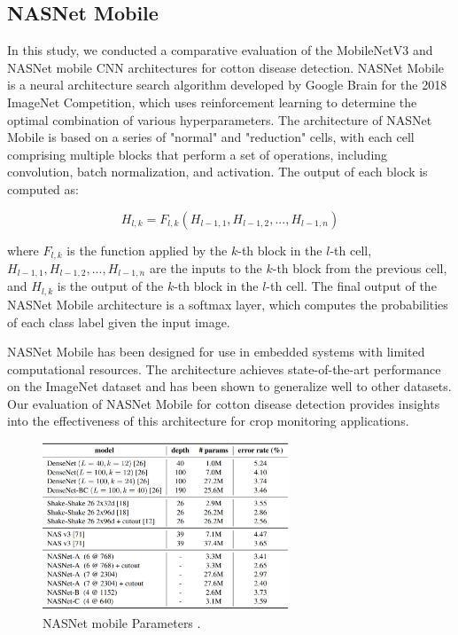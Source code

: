 \documentclass[conference]{IEEEtran}
\begin{document}
\subsection{NASNet Mobile}
In this study, we conducted a comparative evaluation of the MobileNetV3 and NASNet mobile CNN architectures for cotton disease detection. NASNet Mobile is a neural architecture search algorithm developed by Google Brain for the 2018 ImageNet Competition, which uses reinforcement learning to determine the optimal combination of various hyperparameters. The architecture of NASNet Mobile is based on a series of "normal" and "reduction" cells, with each cell comprising multiple blocks that perform a set of operations, including convolution, batch normalization, and activation. The output of each block is computed as:

\begin{equation}
H_{l,k} = F_{l,k}(H_{l-1,1},H_{l-1,2},...,H_{l-1,n})
\end{equation}

where $F_{l,k}$ is the function applied by the $k$-th block in the $l$-th cell, $H_{l-1,1},H_{l-1,2},...,H_{l-1,n}$ are the inputs to the $k$-th block from the previous cell, and $H_{l,k}$ is the output of the $k$-th block in the $l$-th cell. The final output of the NASNet Mobile architecture is a softmax layer, which computes the probabilities of each class label given the input image.

NASNet Mobile has been designed for use in embedded systems with limited computational resources. The architecture achieves state-of-the-art performance on the ImageNet dataset and has been shown to generalize well to other datasets. Our evaluation of NASNet Mobile for cotton disease detection provides insights into the effectiveness of this architecture for crop monitoring applications.
\begin{figure}[h]
\centerline{\includegraphics[height=5cm, width = 1\linewidth]{Images/Capture.pdf}}
\caption{NASNet mobile Parameters \cite{Zoph-Vasudevan}. }
\label{Nas Arch}
\end{figure}
\end{document}
